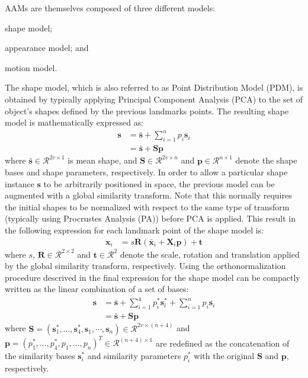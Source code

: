 AAMs are themselves composed of three different models:
\begin{inparaenum}[(i)]
	\item shape model; 
	\item appearance model; and
	\item motion model. 
\end{inparaenum} 

The shape model, which is also referred to as Point Distribution Model (PDM), is obtained by typically applying Principal Component Analysis (PCA) to the set of object's shapes defined by the previous landmarks points. The resulting shape model is mathematically expressed as:
\begin{equation}
	\begin{aligned}
		\mathbf{s} & = \mathbf{\bar{s}} + \sum_{i=1}^n p_i \mathbf{s}_i 
        \\
        & = \mathbf{\bar{s}} + \mathbf{S} \mathbf{p}
	\end{aligned}
\end{equation}
where $\mathbf{\bar{s}} \in \mathcal{R}^{2v \times 1}$ is mean shape, and $\mathbf{S} \in  \mathcal{R}^{2v \times  n}$ and $\mathbf{p} \in \mathcal{R}^{n \times 1}$ denote the shape bases and shape parameters, respectively. In order to allow a particular shape instance $\mathbf{s}$ to be arbitrarily positioned in space, the previous model can be augmented with a global similarity transform. Note that this normally requires the initial shapes to be normalized with respect to the same type of transform (typically using Procrustes Analysis (PA)) before PCA is applied. This result in the following expression for each landmark point of the shape model is:
\begin{equation}
	\begin{aligned}
		\mathbf{x}_i & = s \mathbf{R} \left( \mathbf{\bar{x}}_i + \mathbf{X}_i \mathbf{p} \right) + \mathbf{t}
	\end{aligned}
\end{equation}
where $s$, $\mathbf{R} \in \mathcal{R}^{2 \times 2}$ and $\mathbf{t} \in \mathcal{R}^2$  denote the scale, rotation and translation applied by the global similarity transform, respectively. Using the orthonormalization procedure descrived in \cite{Matthews2004} the final expression for the shape model can be compactly written as the linear combination of a set of bases:
\begin{equation}
	\begin{aligned}
		\mathbf{s} & = \mathbf{\bar{s}} + \sum_{i=1}^4 p^*_i \mathbf{s}^*_i + \sum_{i=1}^n p_i \mathbf{s}_i 
        \\
        & = \mathbf{\bar{s}} + \mathbf{S} \mathbf{p}
	\end{aligned}
    \label{eq:shape_model}
\end{equation}
where $\mathbf{S} = (\mathbf{s}^*_1, \dots, \mathbf{s}^*_4, \mathbf{s}_1, \cdots, \mathbf{s}_n) \in \mathcal{R}^{2v \times (n+4)}$ and $\mathbf{p} = (p^*_1, \dots, p^*_4, p_1, \dots, p_n)^T \in \mathcal{R}^{(n+4) \times 1}$ are redefined as the concatenation of the similarity bases $\mathbf{s}^*_i$ and similarity parameters $p^*_i$ with the original $\mathbf{S}$ and $\mathbf{p}$, respectively.


